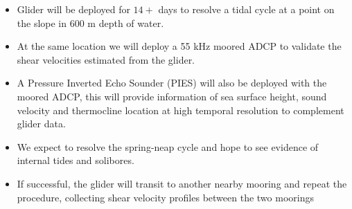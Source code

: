 \documentclass[unknownkeysallowed,usepdftitle=false]{beamer}
\begin{document}
\begin{frame}\label{dep_details} %
\vspace{-0.3cm}
\begin{center}

\begin{columns}
\begin{column}[t]{0.9\textwidth}
\begin{itemize}
\item Glider will be deployed for $14+$ days to resolve a tidal cycle at a point on the slope in 600 m depth of water.
\item At the same location we will deploy a 55 kHz moored ADCP to validate the shear velocities estimated from the glider.
\item A Pressure Inverted Echo Sounder (PIES) will also be deployed with the moored ADCP, this will provide information of sea surface height, sound velocity and thermocline location at high temporal resolution to complement glider data.
\item We expect to resolve the spring-neap cycle and hope to see evidence of internal tides and solibores.
\item If successful, the glider will transit to another nearby mooring and repeat the procedure, collecting shear velocity profiles between the two moorings 
\end{itemize}
\end{column}
\end{columns}
\end{center}
\end{frame}
\end{document}
